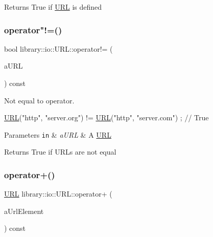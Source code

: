\begin{DoxyReturn}{Returns}
True if \hyperlink{classlibrary_1_1io_1_1_u_r_l}{U\+RL} is defined 
\end{DoxyReturn}
\mbox{\label{classlibrary_1_1io_1_1_u_r_l_a821743d11216826fa475d9b87f37e6cb}} 
\subsubsection{\texorpdfstring{operator"!=()}{operator!=()}}
{\footnotesize\ttfamily bool library\+::io\+::\+U\+R\+L\+::operator!= (\begin{DoxyParamCaption}\item[{const \hyperlink{classlibrary_1_1io_1_1_u_r_l}{U\+RL} \&}]{a\+U\+RL }\end{DoxyParamCaption}) const}



Not equal to operator. 


\begin{DoxyCode}
\hyperlink{classlibrary_1_1io_1_1_u_r_l_a7e9c070138a6dbd000ffb10b7cd8a5c4}{URL}(\textcolor{stringliteral}{"http"}, \textcolor{stringliteral}{"server.org"}) != \hyperlink{classlibrary_1_1io_1_1_u_r_l_a7e9c070138a6dbd000ffb10b7cd8a5c4}{URL}(\textcolor{stringliteral}{"http"}, \textcolor{stringliteral}{"server.com"}) ; \textcolor{comment}{// True}
\end{DoxyCode}



\begin{DoxyParams}[1]{Parameters}
\mbox{\tt in}  & {\em a\+U\+RL} & A \hyperlink{classlibrary_1_1io_1_1_u_r_l}{U\+RL} \\
\hline
\end{DoxyParams}
\begin{DoxyReturn}{Returns}
True if U\+R\+Ls are not equal 
\end{DoxyReturn}
\mbox{\label{classlibrary_1_1io_1_1_u_r_l_a1a2d5bb517344d5ce72e8dc48c86fef1}} 
\subsubsection{\texorpdfstring{operator+()}{operator+()}}
{\footnotesize\ttfamily \hyperlink{classlibrary_1_1io_1_1_u_r_l}{U\+RL} library\+::io\+::\+U\+R\+L\+::operator+ (\begin{DoxyParamCaption}\item[{const \hyperlink{namespacelibrary_1_1io_a7469b45835a4421045db344d6a5a1f85}{String} \&}]{a\+Url\+Element }\end{DoxyParamCaption}) const}



